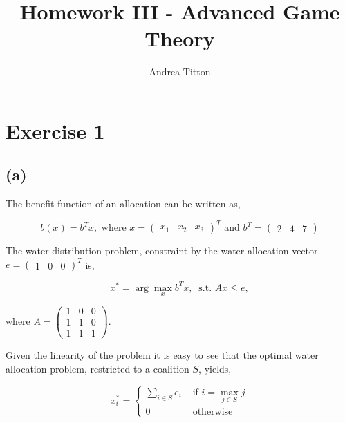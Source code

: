 \documentclass[american]{scrartcl}
\title{Homework III - Advanced Game Theory }
\author{Andrea Titton}
\begin{document}

\maketitle

\section*{Exercise 1}

\subsection*{(a)}

The benefit function of an allocation can be written as,

\begin{equation}
    b(x) = b^T x, \text{ where } x = \begin{pmatrix}
        x_1 & x_2 & x_3
    \end{pmatrix}^T \text{ and }b^T = \begin{pmatrix}
        2 & 4 & 7
    \end{pmatrix}
\end{equation}

The water distribution problem, constraint by the water allocation vector $e = \begin{pmatrix} 1 & 0 & 0 \end{pmatrix}^T$ is,

\begin{equation}
    x^* = \arg\max_{x}  b^T x, \ \text{ s.t. } A x \leq e,
\end{equation}

where $A = \begin{pmatrix}
        1 & 0 & 0 \\
        1 & 1 & 0 \\
        1 & 1 & 1
    \end{pmatrix}$.

Given the linearity of the problem it is easy to see that the optimal water allocation problem, restricted to a coalition $S$, yields,

\begin{equation} \label{opt_all_river}
    x^*_i = \begin{cases}
        \sum_{i \in S} e_i & \text{ if } i = \max_{j \in S} j \\
        0                  & \text{ otherwise}
    \end{cases}
\end{equation}
\end{document}
